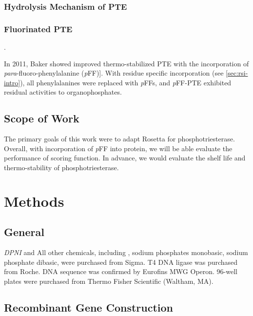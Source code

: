 \begin{refsection}
\subsubsection{Hydrolysis Mechanism of PTE}

\subsubsection{Fluorinated PTE}.

In 2011, Baker  showed improved thermo-stabilized PTE with the
incorporation of \emph{para}-fluoro-phenylalanine
(\emph{p}FF)]\cite{Baker2011b}. With residue specific incorporation (see
\ref{sec:rsi-intro}), all phenylalanines were replaced with \emph{p}FFs, and
\emph{p}FF-PTE exhibited residual activities to organophosphates.

\subsection{Scope of Work}

The primary goals of this work were to adapt Rosetta for phosphotriesterase.
Overall, with incorporation of \emph{p}FF into protein, we will be able
evaluate the performance of scoring function. In advance, we would evaluate the
shelf life and thermo-stability of phosphotriesterase.

\section{Methods}

\subsection{General}

\emph{DPNI} and  All other chemicals, including , sodium phosphates monobasic, sodium phosphate dibasic, were purchased from Sigma. T4 DNA ligase
was purchased from Roche. DNA sequence was confirmed by Eurofins MWG Operon.
96-well plates were purchased from Thermo Fisher Scientific (Waltham, MA).

\subsection{Recombinant Gene Construction}


\end{refsection}
